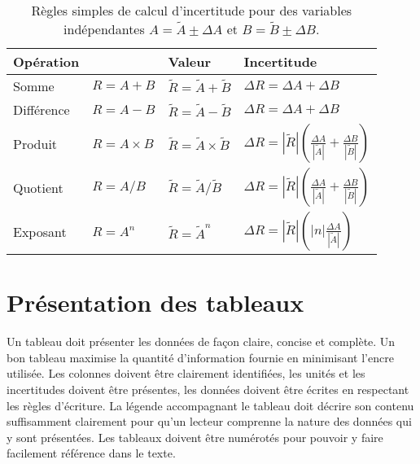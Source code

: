 \documentclass[letterpaper, DIV=11]{scrartcl}
\begin{document}
\begin{table}
  \renewcommand{\arraystretch}{1.5}
  \centering
  \begin{tabular}{llll}
    \toprule
    Opération   & &  Valeur &  Incertitude  \\
    \midrule
    Somme  &  $R = A + B$
      &  $\tilde{R} = \tilde{A} + \tilde{B}$
      & $\Delta R = \Delta A + \Delta B$ \\
    Différence  &  $R = A - B$
      &  $\tilde{R} = \tilde{A} - \tilde{B}$
      & $\Delta R = \Delta A + \Delta B$ \\
    Produit  &   $R = A \times B$
      &  $\tilde{R} = \tilde{A} \times \tilde{B}$
      & $\Delta R = \left|\tilde{R}\right| \left(
          \displaystyle{\frac{\Delta A}{\left|\tilde{A}\right|}} + \displaystyle{\frac{\Delta
          B}{\left|\tilde{B}\right|}}
        \right)$ \\
    Quotient  &  $R = A / B$
      &  $\tilde{R} = \tilde{A} / \tilde{B}$
      & $\Delta R = \left|\tilde{R}\right| \left(
          \displaystyle{\frac{\Delta A}{\left|\tilde{A}\right|}} + \displaystyle{\frac{\Delta B}{\left|\tilde{B}\right|}}
        \right)$ \\
    Exposant  &  $R = A^n$
      &  $\tilde{R} = \tilde{A}^n$
      & $\Delta R = \left|\tilde{R}\right|
      \left(\left|n\right|\displaystyle{\frac{\Delta A}{\left|\tilde{A}\right|}}\right)$ \\
      \bottomrule
  \end{tabular}
  \caption{Règles simples de calcul d'incertitude pour des variables
  indépendantes $A = \tilde{A} \pm \Delta A$ et $B = \tilde{B} \pm \Delta B$.}
  \label{tab:regles_simples}
\end{table}


\section*{Présentation des tableaux}

Un tableau doit présenter les données de façon claire, concise et complète. Un
bon tableau maximise la quantité d'information fournie en minimisant l'encre
utilisée. Les colonnes doivent être clairement identifiées, les unités et les
incertitudes doivent être présentes, les données doivent être écrites en
respectant les règles d'écriture. La légende accompagnant le tableau doit
décrire son contenu suffisamment clairement pour qu'un lecteur comprenne la
nature des données qui y sont présentées. Les tableaux doivent être numérotés
pour pouvoir y faire facilement référence dans le texte.
\end{document}
